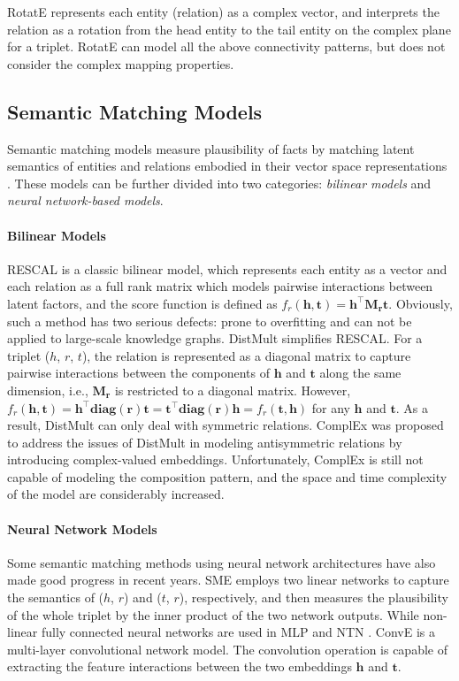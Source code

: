 \documentclass[conference]{IEEEtran}
\begin{document}
RotatE \cite{RotatE} represents each entity (relation) as a complex vector, and interprets the relation as a rotation from the head entity to the tail entity on the complex plane for a triplet. RotatE can model all the above connectivity patterns, but does not consider the complex mapping properties.

\subsection{Semantic Matching Models}
Semantic matching models measure plausibility of facts by matching latent semantics of entities and relations embodied in their vector space representations \cite{Survey}. These models can be further divided into two categories: \textit{bilinear models} and \textit{neural network-based models}.

\paragraph{Bilinear Models}
RESCAL \cite{RESCAL} is a classic bilinear model, which represents each entity as a vector and each relation as a full rank matrix which models pairwise interactions between latent factors, and the score function is defined as $f_r(\bm{h},\bm{t}) = \bm{h^{\top}M_rt}$. Obviously, such a method has two serious defects: prone to overfitting and can not be applied to large-scale knowledge graphs.
DistMult \cite{DistMult} simplifies RESCAL. For a triplet ($h$, $r$, $t$), the relation is represented as a diagonal matrix to capture pairwise interactions between the components of $\bm{h}$ and $\bm{t}$ along the same dimension, i.e., $\bm{M_r}$ is restricted to a diagonal matrix. However, $f_r(\bm{h},\bm{t}) = \bm{h^{\top}diag(r)t} = \bm{t^{\top}diag(r)h} = f_r(\bm{t},\bm{h})$ for any $\bm{h}$ and $\bm{t}$. As a result, DistMult can only deal with symmetric relations. ComplEx \cite{ComplEx} was proposed to address the issues of DistMult in modeling antisymmetric relations by introducing complex-valued embeddings. Unfortunately, ComplEx is still not capable of modeling the composition pattern, and the space and time complexity of the model are considerably increased. 

\paragraph{Neural Network Models}
Some semantic matching methods using neural network architectures have also made good progress in recent years. SME \cite{SME} employs two linear networks to capture the semantics of ($h$, $r$) and ($t$, $r$), respectively, and then measures the plausibility of the whole triplet by the inner product of the two network outputs. While non-linear fully connected neural networks are used in MLP \cite{MLP} and NTN \cite{NTN}. ConvE \cite{ConvE} is a multi-layer convolutional network model. The convolution operation is capable of extracting the feature interactions between the two embeddings $\bm{h}$ and $\bm{t}$. 
\end{document}
